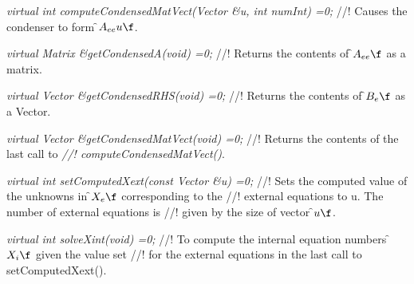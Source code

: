 {\em virtual int computeCondensedMatVect(Vector \&u, int numInt) =0;}
//! Causes the condenser to form \f$A_{ee} u\f$.

{\em virtual Matrix \&getCondensedA(void) =0;}
//! Returns the contents of \f$A_{ee}\f$ as a matrix.

{\em virtual Vector \&getCondensedRHS(void) =0;}
//! Returns the contents of \f$B_e\f$ as a Vector.

{\em virtual Vector \&getCondensedMatVect(void) =0;}
//! Returns the contents of the last call to {\em
//! computeCondensedMatVect()}.

{\em virtual int setComputedXext(const Vector \&u) =0;}
//! Sets the computed value of the unknowns in \f$X_e\f$ corresponding to the
//! external equations to \p u. The number of external equations is
//! given by the size of vector \f$u\f$.

{\em  virtual int solveXint(void) =0;}
//! To compute the internal equation numbers \f$X_i\f$ given the value set
//! for the external equations in the last call to setComputedXext().

